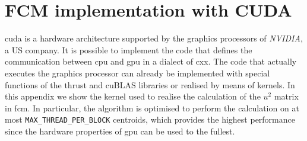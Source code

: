 \chapter{FCM implementation with CUDA} \label{appendix:fcm_kernel}
\gls{cuda} is a hardware architecture supported by the graphics processors of \emph{NVIDIA}, a US company. It is possible to implement the code that defines the communication between \gls{cpu} and \gls{gpu} in a dialect of \gls{cxx}. The code that actually executes the graphics processor can already be implemented with special functions of the \gls{thrust} and \gls{cuBLAS} libraries or realised by means of kernels. In this appendix we show the kernel used to realise the calculation of the $u^2$ matrix in \gls{fcm}. In particular, the algorithm is optimised to perform the calculation on at most \texttt{MAX\_THREAD\_PER\_BLOCK} centroids, which provides the highest performance since the hardware properties of \gls{gpu} can be used to the fullest.
\newpage
